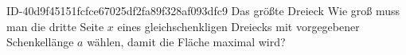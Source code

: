 \begin{exercise}
      {ID-40d9f45151fcfce67025df2fa89f328af093dfc9}
      {Das größte Dreieck}
  \ifproblem\problem
    Wie groß muss man die dritte Seite $x$ eines gleichschenkligen Dreiecks
    mit vorgegebener Schenkellänge $a$ wählen, damit die Fläche maximal
    wird?
    \begin{center}
    \end{center}
  \fi
\end{exercise}
